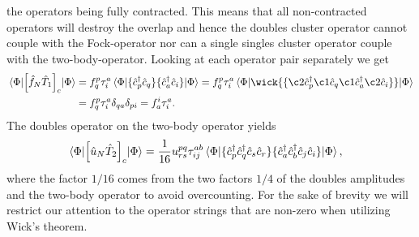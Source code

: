         the operators being fully contracted.
        This means that all non-contracted operators will destroy the overlap
        and hence the doubles cluster operator cannot couple with the
        Fock-operator nor can a single singles cluster operator couple with the
        two-body-operator.
        Looking at each operator pair separately we get
        \begin{align}
            \mel{\slat}{
                \brak{
                    \fock_N\clust_1
                }_c
            }{\slat}
            &=
            \fockten^{p}_{q}\clustamp^{a}_{i}
            \mel{\slat}{
                \normalord{
                    \ccr{p}\can{q}
                }\normalord{
                    \ccr{a}
                    \can{i}
                }
            }{\slat}
            =
            \fockten^{p}_{q}\clustamp^{a}_{i}
            \mel{\slat}{
                \wick{
                    \normalord{
                        \c2 {\ccr{p}}
                        \c1 {\can{q}}
                        \c1 {\ccr{a}}
                        \c2 {\can{i}}
                    }
                }
            }{\slat}
            \\
            &=
            \fockten^{p}_{q}\clustamp^{a}_{i}
            \delta_{qa}\delta_{pi}
            = \fockten^{i}_{a}\clustamp^{a}_{i}.
        \end{align}
        The doubles operator on the two-body operator yields
        \begin{align}
            \mel{\Phi}{\left[ 
                \hat{u}_N \hat{T}_2
             \right]_c}{\Phi}
            &=
            \frac{1}{16}u^{pq}_{rs}\tau^{ab}_{ij}
            \mel{\Phi}{
                \{ 
                    \hat{c}_{p}^{\dagger}
                    \hat{c}_{q}^{\dagger}
                    \hat{c}_{s}
                    \hat{c}_{r}
                 \}
                \{ 
                    \hat{c}_{a}^{\dagger}
                    \hat{c}_{b}^{\dagger}
                    \hat{c}_{j}
                    \hat{c}_{i}
                 \}
            }{\Phi},
        \end{align}
        where the factor $1/16$ comes from the two factors $1/4$ of the doubles
        amplitudes and the two-body operator to avoid overcounting.
        For the sake of brevity we will restrict our attention to the operator
        strings that are non-zero when utilizing Wick's theorem.
